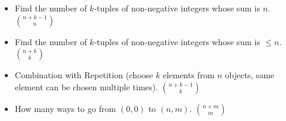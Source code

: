 \vspace{-4.5mm}
{\footnotesize
\begin{itemize}
\item Find the number of $k$-tuples of non-negative integers whose sum is $n$. \quad $\binom{n+k-1}{n}$
\item Find the number of $k$-tuples of non-negative integers whose sum is $\le n$. \quad $\binom{n+k}{k}$
\item Combination with Repetition (choose $k$ elements from $n$ objects, same element can be chosen multiple times). \quad $\binom{n+k-1}{k}$
\item How many ways to go from $(0,0)$ to $(n,m)$. \quad $\binom{n+m}{m}$
\end{itemize}\medskip\medskip\medskip
}
